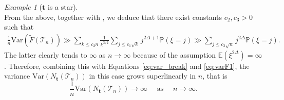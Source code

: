 \documentclass[article]{amsart}
\newcommand{\Var} {\mathrm {Var}}
\newcommand{\Prob} {\mathbb {P}}
\newcommand{\prob}[1]{\Prob\left(#1\right)}
\newcommand{\tc}{\mathcal{T}}
\newcommand{\st}{\textbf{t}}
\newcommand{\N}{N_{\st}}
\newcommand{\E}{\mathbb{E}}
\theoremstyle{definition}
\theoremstyle{remark}
\newtheorem{example}[theorem]{Example}
\begin{document}
\begin{example}[$\st$ is a star]
\[    \]
    From the above, together with \cite[Lemma~5.2, Part~(i)]{J16}, we deduce that there exist constants $c_2,c_3>0$ such that
    \begin{align*}
        \frac{1}{n}\mathrm{Var}(\tilde  F(\tc_n)) 
         \gg \sum_{k\leq c_2n}\frac{1}{k^{3/2}}\sum_{j\leq c_1\sqrt{k}}j^{2\Delta+1}\prob{\xi=j}
         \gg  \sum_{j\leq c_3\sqrt{n}} j^{2\Delta}\prob{\xi=j}.
    \end{align*}
    The latter clearly tends to $\infty$ as $n\to\infty$ because of the assumption $\E(\xi^{2\Delta})=\infty$. Therefore, combining this with Equations \eqref{eq:var_break} and \eqref{eq:varF1}, the variance $\Var(\N(\tc_n))$ in this case grows superlinearly in $n$, that is 
    \[
    \frac{1}{n}\Var(\N(\tc_n))\to \infty \quad \text{ as } \quad n\to \infty. 
    \]
\end{example}


\end{document}
